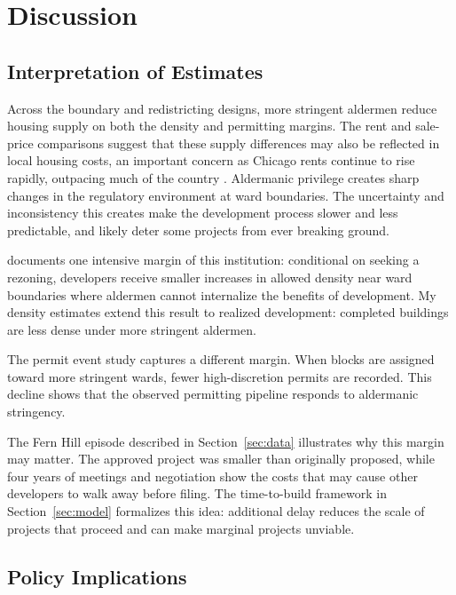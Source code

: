 
\section{Discussion}
\label{sec:discussion}

\subsection{Interpretation of Estimates}

Across the boundary and redistricting designs, more stringent aldermen reduce housing supply on both the density and permitting margins.
The rent and sale-price comparisons suggest that these supply differences may also be reflected in local housing costs, an important concern as Chicago rents continue to rise rapidly, outpacing much of the country \citep{davis_chicagos_2026}.
Aldermanic privilege creates sharp changes in the regulatory environment at ward boundaries.
The uncertainty and inconsistency this creates make the development process slower and less predictable, and likely deter some projects from ever breaking ground.

\citet{khan_decentralized_2021} documents one intensive margin of this institution: conditional on seeking a rezoning, developers receive smaller increases in allowed density near ward boundaries where aldermen cannot internalize the benefits of development.
My density estimates extend this result to realized development: completed buildings are less dense under more stringent aldermen.

The permit event study captures a different margin.
When blocks are assigned toward more stringent wards, fewer high-discretion permits are recorded.
This decline shows that the observed permitting pipeline responds to aldermanic stringency.

The Fern Hill episode described in Section~\ref{sec:data} illustrates why this margin may matter.
The approved project was smaller than originally proposed, while four years of meetings and negotiation show the costs that may cause other developers to walk away before filing.
The time-to-build framework in Section~\ref{sec:model} formalizes this idea: additional delay reduces the scale of projects that proceed and can make marginal projects unviable.

\subsection{Policy Implications}


